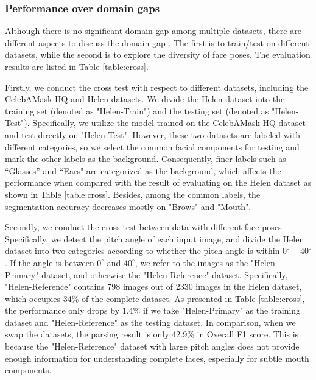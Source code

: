 \subsubsection{Performance over domain gaps}
Although there is no significant domain gap among multiple datasets, there are different aspects to discuss the domain gap \cite{luo2021category,luo2019significance}. The first is to train/test on different datasets, while the second is to explore the diversity of face poses. The evaluation results are listed in Table \ref{table:cross}.

Firstly, we conduct the cross test with respect to different datasets, including the CelebAMask-HQ and Helen datasets. 
We divide the Helen dataset into the training set (denoted as "Helen-Train") and the testing set (denoted as "Helen-Test"). 
Specifically, we utilize the model trained on the CelebAMask-HQ dataset and test directly on "Helen-Test". However, these two datasets are labeled with different categories, so we select the common facial components for testing and mark the other labels as the background. 
Consequently, finer labels such as ``Glasses” and ``Ears" are categorized as the background, which affects the performance when compared with the result of evaluating on the Helen dataset as shown in Table \ref{table:cross}. 
Besides, among the common labels, the segmentation accuracy decreases mostly on "Brows" and "Mouth".

{Secondly, we conduct the cross test between data with different face poses. 
Specifically, we detect the pitch angle of each input image, and divide the Helen dataset into two categories according to whether the pitch angle is within $0^\circ-40^\circ$. If the angle is between $0^\circ$ and $40^\circ$, we refer to the images as the "Helen-Primary" dataset, and otherwise the "Helen-Reference" dataset. 
Specifically, "Helen-Reference" contains 798 images out of 2330 images in the Helen dataset, which occupies 34\% of the complete dataset. 
As presented in Table \ref{table:cross}, the performance only drops by 1.4\% if we take "Helen-Primary" as the training dataset and "Helen-Reference" as the testing dataset. 
In comparison, when we swap the datasets, the parsing result is only 42.9\% in Overall F1 score. This is because the "Helen-Reference" dataset with large pitch angles does not provide enough information for understanding complete faces, especially for subtle mouth components.}

